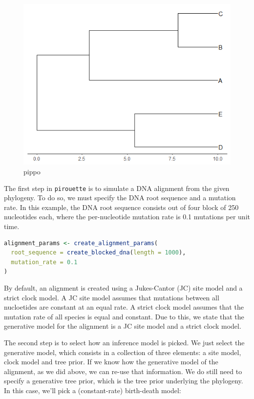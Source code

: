 \documentclass{article}
\begin{document}
\begin{figure}[h]
  \includegraphics[width=\textwidth]{figure_bd.png}
  \caption{pippo}
\end{figure}

The first step in \verb;pirouette; is to simulate a DNA alignment from the 
given phylogeny. To do so, we must specify the DNA root sequence
and a mutation rate. In this example, the DNA root sequence consists
out of four block of 250 nucleotides each, where the per-nucleotide
mutation rate is 0.1 mutations per unit time.

\begin{lstlisting}[language=R, floatplacement=H, frame=single]
alignment_params <- create_alignment_params(
  root_sequence = create_blocked_dna(length = 1000),
  mutation_rate = 0.1
)
\end{lstlisting}

By default, an alignment is created using a Jukes-Cantor (JC) site model
and a strict clock model. A JC site model assumes that mutations
between all nucloetides are constant at an equal rate. 
A strict clock model assumes that
the mutation rate of all species is equal and constant.
Due to this, we state that the generative model for the alignment is
a JC site model and a strict clock model.

The second step is to select how an inference model is picked.
We just select the generative model, which consists in a collection of 
three elements: a site model, clock model and tree prior. 
If we know how the generative model of the alignment, as we did above,
we can re-use that information. We do still need to specify 
a generative tree prior, which is the tree prior underlying the phylogeny.
In this case, we'll pick a (constant-rate) birth-death model:
\end{document}
